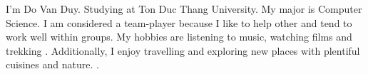 \par{
I’m Do Van Duy. Studying at Ton Duc Thang University. My major is Computer Science. I am considered a team-player because I like to help other and tend to work well within groups.  My hobbies are listening to music, watching films and trekking . Additionally, I enjoy travelling and exploring new places with plentiful cuisines and nature. .
}
